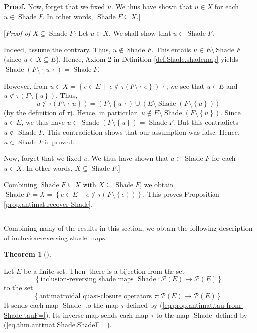 \documentclass[numbers=enddot,12pt,final,onecolumn]{scrartcl}%
\theoremstyle{definition}
\newtheorem{theo}{Theorem}[section]
\newenvironment{theorem}[1][]
{\begin{theo}[#1]\begin{leftbar}}
{\end{leftbar}\end{theo}}
\newenvironment{proof}[1][Proof]{\noindent\textbf{#1.} }{\ \rule{0.5em}{0.5em}}
\newenvironment{verlong}{}{}
\begin{document}
\begin{verlong}
\begin{proof}
Now, forget that we fixed $u$. We thus have shown that $u\in X$ for each
$u\in\operatorname*{Shade}F$. In other words, $\operatorname*{Shade}F\subseteq
X$.]

[\textit{Proof of }$X\subseteq\operatorname*{Shade}F$\textit{:} Let $u\in X$.
We shall show that $u\in\operatorname*{Shade}F$.

Indeed, assume the contrary. Thus, $u\notin\operatorname*{Shade}F$. This
entails $u\in E\setminus\operatorname*{Shade}F$ (since $u\in X\subseteq E$).
Hence, Axiom 2 in Definition \ref{def.Shade.shademap} yields
$\operatorname*{Shade}\left(  F\setminus\left\{  u\right\}  \right)
=\operatorname*{Shade}F$.

However, from $u\in X=\left\{  e\in E\ \mid\ e\notin\tau\left(  F\setminus
\left\{  e\right\}  \right)  \right\}  $, we see that $u\in E$ and
$u\notin\tau\left(  F\setminus\left\{  u\right\}  \right)  $. Thus,%
\[
u\notin\tau\left(  F\setminus\left\{  u\right\}  \right)  =\left(
F\setminus\left\{  u\right\}  \right)  \cup\left(  E\setminus
\operatorname*{Shade}\left(  F\setminus\left\{  u\right\}  \right)  \right)
\]
(by the definition of $\tau$). Hence, in particular, $u\notin E\setminus
\operatorname*{Shade}\left(  F\setminus\left\{  u\right\}  \right)  $. Since
$u\in E$, we thus have $u\in\operatorname*{Shade}\left(  F\setminus\left\{
u\right\}  \right)  =\operatorname*{Shade}F$. But this contradicts
$u\notin\operatorname*{Shade}F$. This contradiction shows that our assumption
was false. Hence, $u\in\operatorname*{Shade}F$ is proved.

Now, forget that we fixed $u$. We thus have shown that $u\in
\operatorname*{Shade}F$ for each $u\in X$. In other words, $X\subseteq
\operatorname*{Shade}F$.]

Combining $\operatorname*{Shade}F\subseteq X$ with $X\subseteq
\operatorname*{Shade}F$, we obtain $\operatorname*{Shade}F=X=\left\{  e\in
E\ \mid\ e\notin\tau\left(  F\setminus\left\{  e\right\}  \right)  \right\}
$. This proves Proposition \ref{prop.antimat.recover-Shade}.
\end{proof}
\end{verlong}

Combining many of the results in this section, we obtain the following
description of inclusion-reversing shade maps:


\begin{theorem}
\label{thm.antimat.Shade.inc-rev-class}Let $E$ be a finite set. Then, there is
a bijection from the set%
\[
\left\{  \text{inclusion-reversing shade maps }\operatorname*{Shade}%
:\mathcal{P}\left(  E\right)  \rightarrow\mathcal{P}\left(  E\right)
\right\}
\]
to the set%
\[
\left\{  \text{antimatroidal quasi-closure operators }\tau:\mathcal{P}\left(
E\right)  \rightarrow\mathcal{P}\left(  E\right)  \right\}  .
\]
It sends each map $\operatorname*{Shade}$ to the map $\tau$ defined by
(\ref{eq.prop.antimat.tau-from-Shade.tauF=}). Its inverse map sends each map
$\tau$ to the map $\operatorname*{Shade}$ defined by
(\ref{eq.thm.antimat.Shade.ShadeF=}).
\end{theorem}
\end{document}

